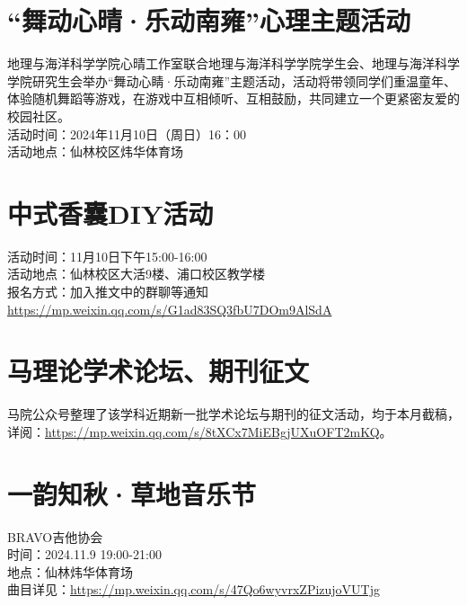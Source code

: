 \documentclass[letterpaper, 12pt]{article}
\begin{document}
\begin{multicols}{2}
\section{“舞动心晴·乐动南雍”心理主题活动}
地理与海洋科学学院心晴工作室联合地理与海洋科学学院学生会、地理与海洋科学学院研究生会举办“舞动心睛·乐动南雍”主题活动，活动将带领同学们重温童年、体验随机舞蹈等游戏，在游戏中互相倾听、互相鼓励，共同建立一个更紧密友爱的校园社区。\\
活动时间：2024年11月10日（周日）16：00\\
活动地点：仙林校区炜华体育场\\
\section{中式香囊DIY活动}
活动时间：11月10日下午15:00-16:00\\
活动地点：仙林校区大活9楼、浦口校区教学楼\\
报名方式：加入推文中的群聊等通知\url{https://mp.weixin.qq.com/s/G1ad83SQ3fbU7DOm9AlSdA}

\section{马理论学术论坛、期刊征文}
马院公众号整理了该学科近期新一批学术论坛与期刊的征文活动，均于本月截稿，详阅：\url{https://mp.weixin.qq.com/s/8tXCx7MiEBgjUXuOFT2mKQ}。
\section{一韵知秋·草地音乐节}
BRAVO吉他协会\\ 
时间：2024.11.9 19:00-21:00\\
地点：仙林炜华体育场\\
曲目详见：\url{https://mp.weixin.qq.com/s/47Qo6wyvrxZPizujoVUTjg}

\end{multicols} 
\end{document}
